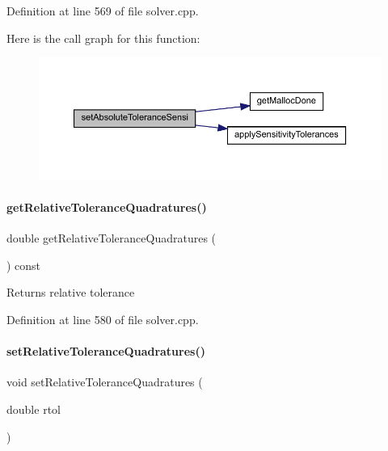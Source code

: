 Definition at line 569 of file solver.\+cpp.

Here is the call graph for this function\+:
\nopagebreak
\begin{figure}[H]
\begin{center}
\leavevmode
\includegraphics[width=350pt]{classamici_1_1_solver_a6f804c48badcbc0dc32da4379c7ff091_cgraph}
\end{center}
\end{figure}
\mbox{\label{classamici_1_1_solver_a40124a6593fea7f5ddbf39385b021a9e}} 
\paragraph{\texorpdfstring{get\+Relative\+Tolerance\+Quadratures()}{getRelativeToleranceQuadratures()}}
{\footnotesize\ttfamily double get\+Relative\+Tolerance\+Quadratures (\begin{DoxyParamCaption}{ }\end{DoxyParamCaption}) const}

\begin{DoxyReturn}{Returns}
relative tolerance 
\end{DoxyReturn}


Definition at line 580 of file solver.\+cpp.

\mbox{\label{classamici_1_1_solver_a086428d30274f2b7e6f94e8e7593dd8b}} 
\paragraph{\texorpdfstring{set\+Relative\+Tolerance\+Quadratures()}{setRelativeToleranceQuadratures()}}
{\footnotesize\ttfamily void set\+Relative\+Tolerance\+Quadratures (\begin{DoxyParamCaption}\item[{double}]{rtol }\end{DoxyParamCaption})}


